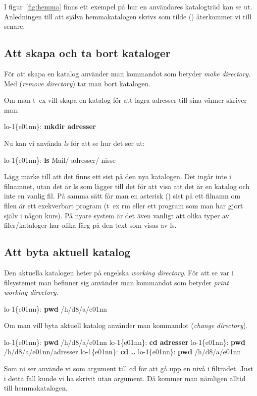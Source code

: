 \documentclass[a4paper,twocolumn]{book}
\begin{document}
I figur~\ref{fig:hemma} finns ett exempel på hur en användares
katalogträd kan se ut. Anledningen till att själva hemmakatalogen
skrivs som tilde (\ST{\~}) återkommer vi till
senare.


\subsection{Att skapa och ta bort kataloger}

För att skapa en katalog använder man kommandot
 som betyder \emph{make directory}. Med 
(\emph{remove directory}) tar man bort katalogen.

Om man t~ex vill skapa en katalog för att lagra adresser till sina
vänner skriver man:
\begin{example}
lo-1\{e01nn\}: \textbf{mkdir adresser}
\end{example}
Nu kan vi använda \emph{ls} för att se hur det ser ut:
\begin{example}
lo-1\{e01nn\}: \textbf{ls}
Mail/      adresser/  nisse
\end{example}
Lägg märke till att det finns ett
\hidettindex{/} sist på den nya katalogen. Det
ingår inte i filnamnet, utan det är ls som lägger till det för att
visa att det är en katalog och inte en vanlig fil. På samma sätt får
man en asterisk (\ttindex{*}) sist på ett filnamn om filen är
ett exekverbart program (t~ex rm eller ett program som man har gjort själv i
någon kurs).
På nyare system är det även vanligt att olika typer av filer/kataloger har olika färg på den text som visas av ls.

\subsection{Att byta aktuell katalog}

Den aktuella katalogen
heter på engelska \emph{working directory}. För att se var i
filsystemet man befinner sig använder man kommandot  som
betyder \emph{print working directory}.
\begin{example}
lo-1\{e01nn\}: \textbf{pwd}
/h/d8/a/e01nn
\end{example}

Om man vill byta aktuell katalog använder man kommandot 
(\emph{change directory}).
\begin{example}
lo-1\{e01nn\}: \textbf{pwd}
/h/d8/a/e01nn
lo-1\{e01nn\}: \textbf{cd adresser}
lo-1\{e01nn\}: \textbf{pwd}
/h/d8/a/e01nn/adresser
lo-1\{e01nn\}: \textbf{cd ..}
lo-1\{e01nn\}: \textbf{pwd}
/h/d8/a/e01nn
\end{example}
Som ni ser använde vi  som argument till cd för att gå upp en
nivå i filträdet. Just i detta fall kunde vi ha skrivit  utan
argument. Då kommer man nämligen alltid till hemmakatalogen.
\end{document}

